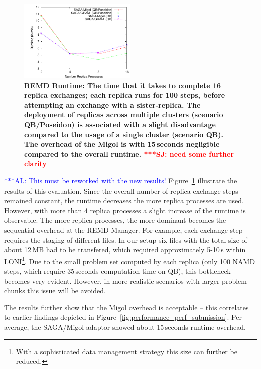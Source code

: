 \documentclass[conference,final]{IEEEtran}
\newcommand{\up}{\vspace*{-1em}}
\newcommand{\alnote}[1]{ {\textcolor{blue} { ***AL: #1 }}}
\newcommand{\jhanote}[1]{ {\textcolor{red} { ***SJ: #1 }}}
\newcommand{\alnote}[1]{}
\newcommand{\jhanote}[1]{}
\begin{document}
\begin{figure}[htb]
    \centering
    \hspace*{-20pt}
        \includegraphics[width=0.5\textwidth]{performance/perf_remd.pdf}
        \caption{\footnotesize \bf REMD Runtime: The time that it
          takes to complete 16 replica exchanges; each replica runs for 100 steps, before attempting an exchange with a
          sister-replica. The deployment of replicas across multiple clusters (scenario QB/Poseidon) is associated 
          with a slight disadvantage compared to the usage of a single cluster (scenario QB).
          The overhead of the Migol is with 15\,seconds negligible compared to the overall runtime. \jhanote{need some further clarity}     
          \up}
    \label{fig:performance_perf_runtime}
\end{figure}     

\alnote{This must be reworked with the new results!}
Figure~\ref{fig:performance_perf_runtime} illustrate the results of
this evaluation. Since the overall number of replica exchange steps
remained constant, the runtime decreases the more replica processes
are used.  However, with more than 4 replica processes a slight
increase of the runtime is observable.
The more replica processes, the more dominant becomes the sequential
overhead at the REMD-Manager. For example, each exchange step requires
the staging of different files. In our setup six files with the total
size of about 12\,MB had to be transfered, which required
approximately 5-10\,s within LONI\footnote{With a sophisticated data
  management strategy this size can further be reduced.}.  Due to the
small problem set computed by each replica (only 100 NAMD steps, which
require 35\,seconds computation time on QB), this bottleneck becomes
very evident. However, in more realistic scenarios with larger problem
chunks this issue will be avoided.

The results further show that the Migol overhead is acceptable -- this
correlates to earlier findings depicted in
Figure~\ref{fig:performance_perf_submission}.  Per average, the
SAGA/Migol adaptor showed about 15\,seconds runtime overhead.
\end{document}
